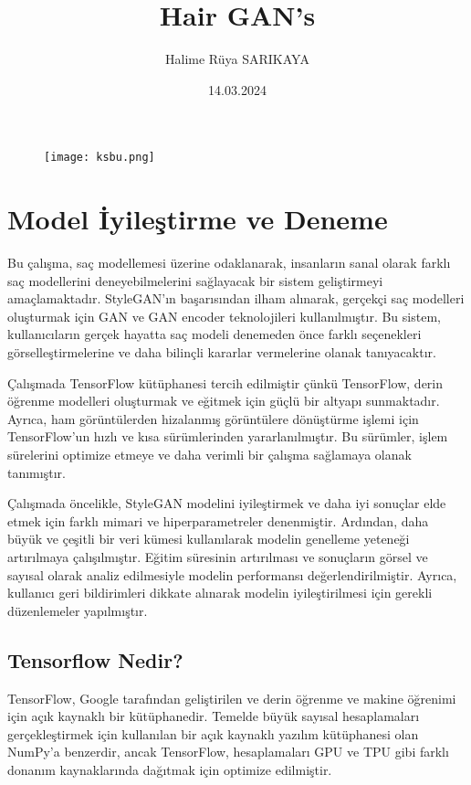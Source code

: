 \documentclass[12pt]{article}
\begin{document}
\begin{figure}
    \centering
    \texttt{[image: ksbu.png]}
    \label{fig:enter-label}
\end{figure}

\title{Hair GAN's}
\author{Halime Rüya SARIKAYA}
\date{14.03.2024}

\maketitle
\newpage
\tableofcontents
\newpage

\section{Model İyileştirme ve Deneme }
Bu çalışma, saç modellemesi üzerine odaklanarak, insanların sanal olarak farklı saç modellerini deneyebilmelerini sağlayacak bir sistem geliştirmeyi amaçlamaktadır. StyleGAN'ın başarısından ilham alınarak, gerçekçi saç modelleri oluşturmak için GAN ve GAN encoder teknolojileri kullanılmıştır. Bu sistem, kullanıcıların gerçek hayatta saç modeli denemeden önce farklı seçenekleri görselleştirmelerine ve daha bilinçli kararlar vermelerine olanak tanıyacaktır.
\cite{kaynakca}

Çalışmada TensorFlow kütüphanesi tercih edilmiştir çünkü TensorFlow, derin öğrenme modelleri oluşturmak ve eğitmek için güçlü bir altyapı sunmaktadır. Ayrıca, ham görüntülerden hizalanmış görüntülere dönüştürme işlemi için TensorFlow'un hızlı ve kısa sürümlerinden yararlanılmıştır. Bu sürümler, işlem sürelerini optimize etmeye ve daha verimli bir çalışma sağlamaya olanak tanımıştır.

Çalışmada öncelikle, StyleGAN modelini iyileştirmek ve daha iyi sonuçlar elde etmek için farklı mimari ve hiperparametreler denenmiştir. Ardından, daha büyük ve çeşitli bir veri kümesi kullanılarak modelin genelleme yeteneği artırılmaya çalışılmıştır. Eğitim süresinin artırılması ve sonuçların görsel ve sayısal olarak analiz edilmesiyle modelin performansı değerlendirilmiştir. Ayrıca, kullanıcı geri bildirimleri dikkate alınarak modelin iyileştirilmesi için gerekli düzenlemeler yapılmıştır.
\subsection{Tensorflow Nedir?}
TensorFlow, Google tarafından geliştirilen ve derin öğrenme ve makine öğrenimi için açık kaynaklı bir kütüphanedir. Temelde büyük sayısal hesaplamaları gerçekleştirmek için kullanılan bir açık kaynaklı yazılım kütüphanesi olan NumPy'a benzerdir, ancak TensorFlow, hesaplamaları GPU ve TPU gibi farklı donanım kaynaklarında dağıtmak için optimize edilmiştir.
\end{document}
